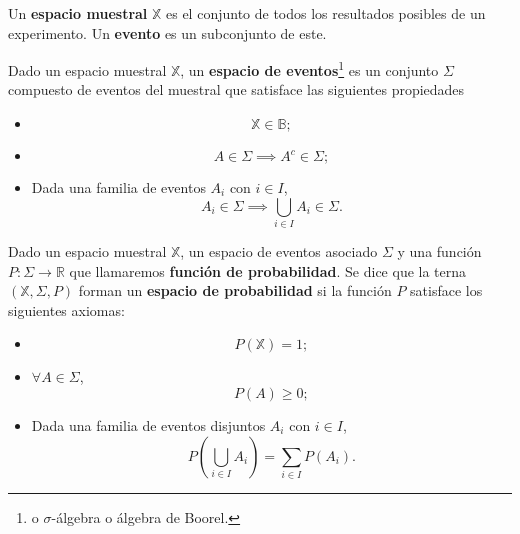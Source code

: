 \begin{definition}
    Un {\bf espacio muestral} $\mathbb{X}$ es el conjunto de todos los resultados posibles de un experimento. Un {\bf evento} es un subconjunto de este.
\end{definition}
\begin{definition}
    Dado un espacio muestral $\mathbb{X}$, un {\bf espacio de eventos}\footnote{o $\sigma$-álgebra o álgebra de Boorel.}  es un conjunto $\Sigma$ compuesto de eventos del muestral que satisface las siguientes propiedades
    \begin{itemize}
        \item 
        \begin{equation}
            \mathbb{X}\in \mathbb{B};
        \end{equation}
        \item 
        \begin{equation}
            A\in\Sigma \implies A^c \in \Sigma;
        \end{equation}
        \item Dada una familia de eventos $A_i$ con $i\in I$,
        \begin{equation}
            A_i\in\Sigma \implies \bigcup_{i\in I} A_i \in \Sigma.
        \end{equation}
    \end{itemize}
\end{definition}
\begin{definition}
    Dado un espacio muestral $\mathbb{X}$, un espacio de eventos asociado $\Sigma$ y una función $P:\Sigma\to \mathbb{R}$ que llamaremos {\bf función de probabilidad}. Se dice que la terna $(\mathbb{X},\Sigma,P)$ forman un {\bf espacio de probabilidad} si la función $P$ satisface los siguientes axiomas:
    \begin{itemize}
        \item 
        \begin{equation}
            P(\mathbb{X}) = 1;
        \end{equation}
        \item $\forall A \in \Sigma$,
        \begin{equation}
            P(A)\geq 0;
        \end{equation}
        \item Dada una familia de eventos disjuntos $A_i$ con $i\in I$,
        \begin{equation}
            P\left( \bigcup_{i\in I} A_i \right) = \sum_{i\in I}P(A_i).
        \end{equation}
    \end{itemize}
\end{definition}

